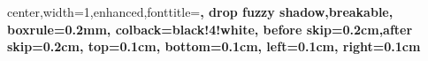 

\makeatletter
\apptocmd\beamer@framenotesbegin
  {\centering}
  {}{}
\makeatother
{}


    { center,width=1\linewidth,enhanced,fonttitle=\large\bfseries,
      drop fuzzy shadow,breakable,
      boxrule=0.2mm,
      colback=black!4!white,
      before skip=0.2cm,after skip=0.2cm,
      top=0.1cm,
      bottom=0.1cm,
      left=0.1cm,
      right=0.1cm
    }

